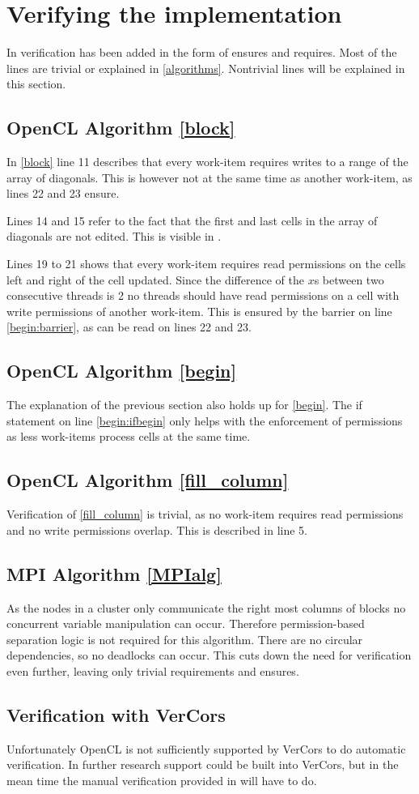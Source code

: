 \section{Verifying the implementation} \label{q3}
In  verification has been added in the form of ensures and requires.
Most of the lines are trivial or explained in \cref{algorithms}.
Nontrivial lines will be explained in this section.

\subsection{OpenCL Algorithm \ref*{block}}
In \cref{block} line 11 describes that every work-item requires writes to a range of the array of diagonals.
This is however not at the same time as another work-item, as lines 22 and 23 ensure.

Lines 14 and 15 refer to the fact that the first and last cells in the array of diagonals are not edited.
This is visible in .

Lines 19 to 21 shows that every work-item requires read permissions on the cells left and right of the cell updated.
Since the difference of the $x$s between two consecutive threads is 2 no threads should have read permissions on a cell with write permissions of another work-item.
This is ensured by the barrier on line \ref{begin:barrier}, as can be read on lines 22 and 23.

\subsection{OpenCL Algorithm \ref*{begin}}
The explanation of the previous section also holds up for \cref{begin}.
The if statement on line \ref{begin:ifbegin} only helps with the enforcement of permissions as less work-items process cells at the same time.

\subsection{OpenCL Algorithm \ref*{fill_column}}
Verification of \cref{fill_column} is trivial, as no work-item requires read permissions and no write permissions overlap.
This is described in line 5.

\subsection{MPI Algorithm \ref*{MPIalg}}
As the nodes in a cluster only communicate the right most columns of blocks no concurrent variable manipulation can occur.
Therefore permission-based separation logic is not required for this algorithm.
There are no circular dependencies, so no deadlocks can occur.
This cuts down the need for verification even further, leaving only trivial requirements and ensures.

\subsection{Verification with VerCors}
Unfortunately OpenCL is not sufficiently supported by VerCors to do automatic verification.
In further research support could be built into VerCors, but in the mean time the manual verification provided in  will have to do.

